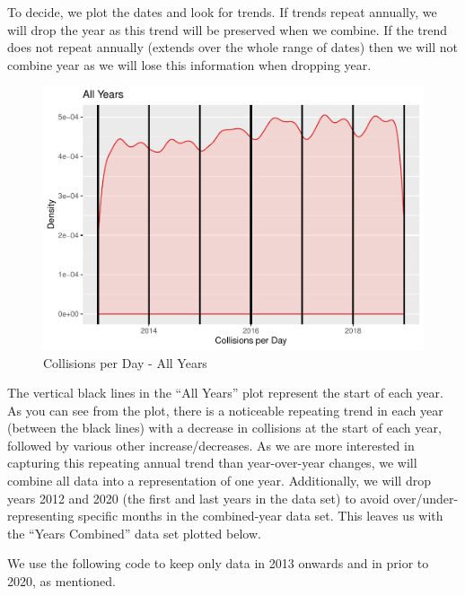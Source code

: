 To decide, we plot the dates and look for trends. If trends repeat
annually, we will drop the year as this trend will be preserved when we
combine. If the trend does not repeat annually (extends over the whole
range of dates) then we will not combine year as we will lose this
information when dropping year.

\begin{Schunk}
\begin{figure}

{\centering \includegraphics{RMarkdown-Group_10-Assignment_1_files/figure-latex/unnamed-chunk-4-1} 

}

\caption[Collisions per Day - All Years]{Collisions per Day - All Years}\label{fig:unnamed-chunk-4}
\end{figure}
\end{Schunk}

The vertical black lines in the ``All Years'' plot represent the start
of each year. As you can see from the plot, there is a noticeable
repeating trend in each year (between the black lines) with a decrease
in collisions at the start of each year, followed by various other
increase/decreases. As we are more interested in capturing this
repeating annual trend than year-over-year changes, we will combine all
data into a representation of one year. Additionally, we will drop years
2012 and 2020 (the first and last years in the data set) to avoid
over/under-representing specific months in the combined-year data set.
This leaves us with the ``Years Combined'' data set plotted below.

We use the following code to keep only data in 2013 onwards and in prior
to 2020, as mentioned.

